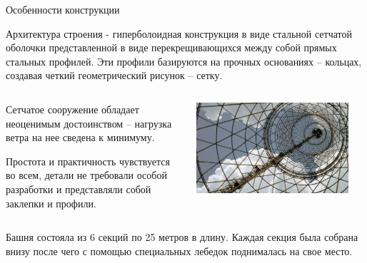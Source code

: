 \begin{frame}{Особенности конструкции}

	Архитектура строения - гиперболоидная конструкция в виде стальной сетчатой оболочки представленной в виде перекрещивающихся между собой прямых стальных профилей. Эти профили базируются на прочных основаниях – кольцах, создавая четкий геометрический рисунок – сетку.

\end{frame}


\begin{frame}{}
	\begin{columns}
		\begin{column}{0.55\textwidth}
			Сетчатое сооружение обладает неоценимым достоинством – нагрузка ветра на нее сведена к минимуму.
\newline

			Простота и практичность чувствуется во всем, детали не требовали особой разработки и представляли собой заклепки и профили.
		\end{column}

		\begin{column}{0.45\textwidth}

			\includegraphics[width=0.9\textwidth]{images/tower-3}

		\end{column}
	\end{columns}
\end{frame}


\begin{frame}{}
	Башня состояла из 6 секций по 25 метров в длину. Каждая секция была собрана внизу после чего с помощью специальных лебедок поднималась на свое место.
\end{frame}


